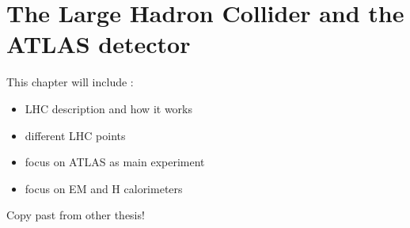 \newpage
\chapter{The Large Hadron Collider and the ATLAS detector}
\label{LHC&ATLAS}

This chapter will include :
\begin{itemize}
    \item LHC description and how it works
    \item different LHC points 
    \item focus on ATLAS as main experiment
    \item focus on EM and H calorimeters 
\end{itemize}

Copy past from other thesis!